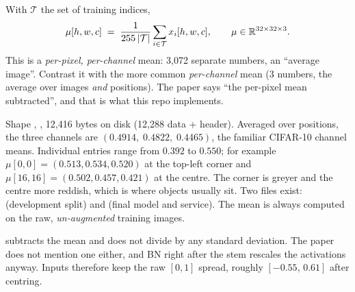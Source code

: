 \begin{idea}
With $\mathcal T$ the set of training indices,
\[
  \mu[h,w,c] \;=\; \frac{1}{255\,|\mathcal T|}\sum_{i\in\mathcal T} x_i[h,w,c], \qquad \mu\in\mathbb{R}^{32\times32\times3}.
\]
This is a \emph{per-pixel, per-channel} mean: 3{,}072 separate numbers, an ``average image''. Contrast it with the more common \emph{per-channel} mean (3 numbers, the average over images \emph{and} positions). The paper says ``the per-pixel mean subtracted'', and that is what this repo implements.
\end{idea}

\begin{center}
\end{center}

\begin{repo}
Shape , , 12{,}416 bytes on disk (12{,}288 data + header). Averaged over positions, the three channels are $(0.4914,\;0.4822,\;0.4465)$, the familiar CIFAR-10 channel means. Individual entries range from $0.392$ to $0.550$; for example $\mu[0,0]=(0.513,0.534,0.520)$ at the top-left corner and $\mu[16,16]=(0.502,0.457,0.421)$ at the centre. The corner is greyer and the centre more reddish, which is where objects usually sit. Two files exist:  (development split) and  (final model and service). The mean is always computed on the raw, \emph{un-augmented} training images.
\end{repo}

\begin{warn}
 subtracts the mean and does not divide by any standard deviation. The paper does not mention one either, and BN right after the stem rescales the activations anyway. Inputs therefore keep the raw $[0,1]$ spread, roughly $[-0.55,\,0.61]$ after centring.
\end{warn}

